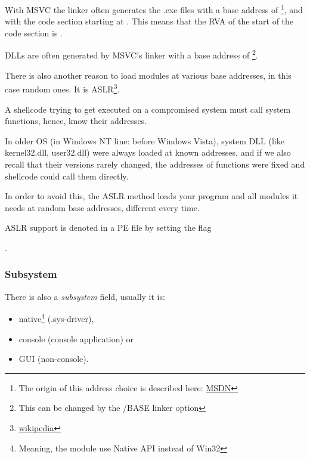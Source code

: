 \par With \ac{MSVC} the linker often generates the .exe files with a base address of 
\footnote{The origin of this address choice is described here: \href{http://go.yurichev.com/17041}{MSDN}},
and with the code section starting at .
This means that the \ac{RVA} of the start of the code section is .

DLLs are often generated by MSVC's linker with a base address of 
\footnote{This can be changed by the /BASE linker option}.


There is also another reason to load modules at various base addresses, in this case random ones.
It is \ac{ASLR}\footnote{\href{http://go.yurichev.com/17140}{wikipedia}}.


A shellcode trying to get executed on a compromised system must call system functions, hence, know their addresses.

In older \ac{OS} (in \gls{Windows NT} line: before Windows Vista),
system DLL (like kernel32.dll, user32.dll) were always loaded at known addresses,
and if we also recall
that their versions rarely changed, the addresses of functions were
fixed and shellcode could call them directly.

In order to avoid this, the \ac{ASLR}
method loads your program and all modules it needs at random base addresses, different every time.

\ac{ASLR} support is denoted in a PE file by setting the flag
\par {} .

\subsubsection{Subsystem}

There is also a \emph{subsystem} field, usually it is:


\begin{itemize}
\item native\footnote{Meaning, the module use Native API instead of Win32} (.sys-driver),

\item console (console application) or

\item \ac{GUI} (non-console).
\end{itemize}


